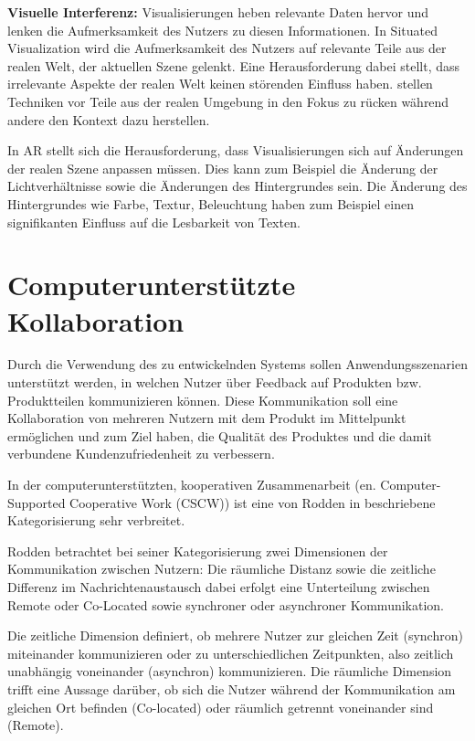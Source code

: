 \textbf{Visuelle Interferenz:}
\cite[S.~243]{DieterSchmalstieg2016} Visualisierungen heben relevante Daten hervor und lenken die Aufmerksamkeit des Nutzers zu diesen Informationen. In Situated Visualization 
wird die Aufmerksamkeit des Nutzers auf relevante Teile aus der realen Welt, der aktuellen Szene gelenkt. Eine Herausforderung dabei stellt, dass irrelevante Aspekte der realen Welt 
keinen störenden Einfluss haben. \cite{Kalkofen2007} stellen Techniken vor Teile aus der realen Umgebung in den Fokus zu rücken während andere den Kontext dazu herstellen. 

In AR stellt sich die Herausforderung, dass Visualisierungen sich auf Änderungen der realen Szene anpassen müssen. Dies kann zum Beispiel die Änderung der Lichtverhältnisse sowie die 
Änderungen des Hintergrundes sein. \cite{Gabbard} Die Änderung des Hintergrundes wie Farbe, Textur, Beleuchtung haben zum Beispiel einen signifikanten Einfluss auf die Lesbarkeit von Texten.   

\section{Computerunterstützte Kollaboration}

Durch die Verwendung des zu entwickelnden Systems sollen Anwendungsszenarien unterstützt werden, in welchen Nutzer 
über Feedback auf Produkten bzw. Produktteilen kommunizieren können. Diese Kommunikation soll eine Kollaboration von 
mehreren Nutzern mit dem Produkt im Mittelpunkt ermöglichen und zum Ziel haben, die Qualität des Produktes und die 
damit verbundene Kundenzufriedenheit zu verbessern.     

In der computerunterstützten, kooperativen Zusammenarbeit (en. Computer-Supported Cooperative Work (CSCW)) 
ist eine von Rodden in \cite[S.~2]{Rodden1992} beschriebene Kategorisierung sehr verbreitet.  


Rodden betrachtet bei seiner Kategorisierung zwei Dimensionen der Kommunikation zwischen Nutzern: 
Die räumliche Distanz sowie die zeitliche Differenz im Nachrichtenaustausch dabei erfolgt eine Unterteilung zwischen 
Remote oder Co-Located sowie synchroner oder asynchroner Kommunikation.

Die zeitliche Dimension definiert, ob mehrere Nutzer zur gleichen Zeit (synchron) miteinander kommunizieren 
oder zu unterschiedlichen Zeitpunkten, also zeitlich unabhängig voneinander (asynchron) kommunizieren. Die räumliche Dimension trifft eine Aussage darüber, ob sich die Nutzer während der Kommunikation am gleichen Ort befinden (Co-located) oder räumlich getrennt voneinander sind (Remote). 



